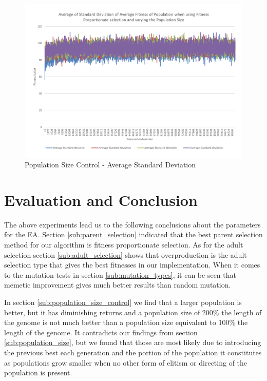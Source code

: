 \begin{figure}[thbp]
	\centerline{\includegraphics[width=\paperwidth]{figures/CircleTests/PopulationSizeControl/CirclePopulationSizeControllAverageStandardDeviation.pdf}}
	\caption{Population Size Control - Average Standard Deviation}
\end{figure}

\clearpage


\section{Evaluation and Conclusion} %
\label{sec:evaluation_and_conclusion}

The above experiments lead us to the following conclusions about the parameters for the EA. Section \ref{sub:parent_selection} indicated that the best parent selection method for our algorithm is fitness proportionate selection. As for the adult selection section \ref{sub:adult_selection} shows that overproduction is the adult selection type that gives the best fitnesses in our implementation. When it comes to the mutation tests in section \ref{sub:mutation_types}, it can be seen that memetic improvement gives much better results than random mutation.

In section \ref{sub:population_size_control} we find that a larger population is better, but it has diminishing returns and a population size of 200\% the length of the genome is not much better than a population size equivalent to 100\% the length of the genome. It contradicts our findings from section \ref{sub:population_size}, but we found that those are most likely due to introducing the previous best each generation and the portion of the population it constitutes as populations grow smaller when no other form of elitism or directing of the population is present.

